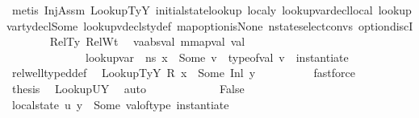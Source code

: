 \begin{isabellebody}
\ {\isacharparenleft}{\kern0pt}metis\ InjAssm\ LookupTyY\ initial{\isacharunderscore}{\kern0pt}state{\isacharunderscore}{\kern0pt}lookup\ localy\ lookup{\isacharunderscore}{\kern0pt}var{\isacharunderscore}{\kern0pt}decl{\isacharunderscore}{\kern0pt}local{\isacharunderscore}{\kern0pt}{}\ lookup{\isacharunderscore}{\kern0pt}var{\isacharunderscore}{\kern0pt}ty{\isacharunderscore}{\kern0pt}decl{\isacharunderscore}{\kern0pt}Some\ lookup{\isacharunderscore}{\kern0pt}vdecls{\isacharunderscore}{\kern0pt}ty{\isacharunderscore}{\kern0pt}def\ map{\isacharunderscore}{\kern0pt}option{\isacharunderscore}{\kern0pt}is{\isacharunderscore}{\kern0pt}None\ nstate{\isachardot}{\kern0pt}select{\isacharunderscore}{\kern0pt}convs{\isacharparenleft}{\kern0pt}{}{\isacharparenright}{\kern0pt}\ option{\isachardot}{\kern0pt}discI{\isacharparenright}{\kern0pt}\isanewline
\ \ \ \ \ \ \isamarkupfalse%
\ RelTy\ RelWt\ \isamarkupfalse%
\ v{\isacharcolon}{\kern0pt}{\isacharcolon}{\kern0pt}{\isachardoublequoteopen}{\isacharparenleft}{\kern0pt}{\isacharprime}{\kern0pt}a{\isacharcolon}{\kern0pt}{\isacharcolon}{\kern0pt}absval{\isacharcomma}{\kern0pt}\ {\isacharprime}{\kern0pt}m{\isacharcolon}{\kern0pt}{\isacharcolon}{\kern0pt}mapval{\isacharparenright}{\kern0pt}\ val{\isachardoublequoteclose}\ \isanewline
\ \ \ \ \ \ \ \ \ \ \ \ \ \ {\isachardoublequoteopen}lookup{\isacharunderscore}{\kern0pt}var\ {\isasymLambda}\ ns\ x\ {\isacharequal}{\kern0pt}\ Some\ v{\isachardoublequoteclose}\ \ {\isachardoublequoteopen}type{\isacharunderscore}{\kern0pt}of{\isacharunderscore}{\kern0pt}val\ v\ {\isacharequal}{\kern0pt}\ instantiate\ {\isasymOmega}\ {\isasymtau}{\isachardoublequoteclose}\isanewline
\ \ \ \ \ \ \ \ \isamarkupfalse%
\ rel{\isacharunderscore}{\kern0pt}well{\isacharunderscore}{\kern0pt}typed{\isacharunderscore}{\kern0pt}def\ \isamarkupfalse%
\ LookupTyY\ {\isacartoucheopen}R\ x\ {\isacharequal}{\kern0pt}\ Some\ {\isacharparenleft}{\kern0pt}Inl\ y{\isacharparenright}{\kern0pt}{\isacartoucheclose}\isanewline
\ \ \ \ \ \ \ \ \isamarkupfalse%
\ fastforce\ \isanewline
\ \ \ \ \ \ \isamarkupfalse%
\ {\isacharquery}{\kern0pt}thesis\ \isamarkupfalse%
\ LookupUY\ \isamarkupfalse%
\ auto\isanewline
\ \ \ \ \isamarkupfalse%
\isanewline
\ \ \ \ \ \ \isamarkupfalse%
\ False\isanewline
\ \ \ \ \ \ \isamarkupfalse%
\ {\isachardoublequoteopen}local{\isacharunderscore}{\kern0pt}state\ {\isacharquery}{\kern0pt}u\ y\ {\isacharequal}{\kern0pt}\ Some\ {\isacharparenleft}{\kern0pt}val{\isacharunderscore}{\kern0pt}of{\isacharunderscore}{\kern0pt}type\ {\isacharparenleft}{\kern0pt}instantiate\ {\isasymOmega}\ {\isasymtau}{\isacharparenright}{\kern0pt}{\isacharparenright}{\kern0pt}{\isachardoublequoteclose}\isanewline

\end{isabellebody}
